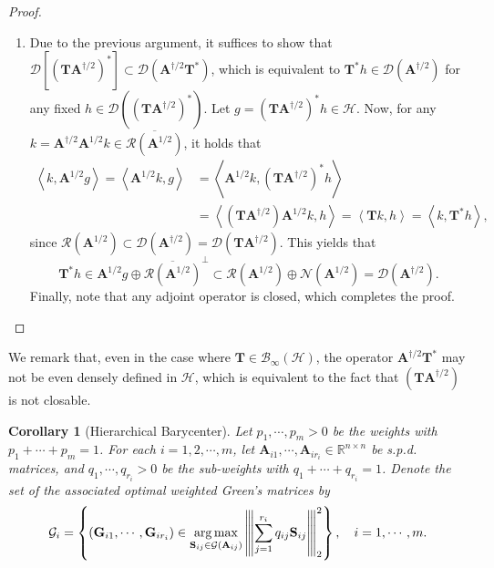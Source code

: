 \documentclass[noinfoline]{imsart}\setcounter{tocdepth}{2}
\renewcommand{\b}[1]{\mathbb{#1}} %
\newcommand{\m}[1]{\mathbf{#1}} %
\renewcommand{\c}[1]{\mathcal{#1}} %
\newcommand{\innpr}[2]{{\left\langle {#1},{#2}\right\rangle}} %
\DeclareMathOperator*{\argmax}{\arg\max}
\newcommand{\vertiii}[1]{{\left\vert\kern-0.25ex\left\vert\kern-0.25ex\left\vert #1 
    \right\vert\kern-0.25ex\right\vert\kern-0.25ex\right\vert}} %
\theoremstyle{plain}
\newtheorem{corollary}[theorem]{Corollary}
\begin{document}
\begin{appendix}
\begin{proof}
\begin{enumerate}[leftmargin=*]
\item %
Due to the previous argument, it suffices to show that $\c{D}[(\m{T} \m{A}^{\dagger/2})^{*}] \subset \c{D}(\m{A}^{\dagger/2} \m{T}^{*})$, which is equivalent to $\m{T}^{*} h \in \c{D}(\m{A}^{\dagger/2})$ for any fixed $h \in \c{D}((\m{T} \m{A}^{\dagger/2})^{*})$. %
Let $g = (\m{T} \m{A}^{\dagger/2})^{*} h  \in \c{H}$. Now, for any $k = \m{A}^{\dagger/2} \m{A}^{1/2} k \in \overline{\c{R}(\m{A}^{1/2})}$, it holds that
\begin{align*}
    \innpr{k}{\m{A}^{1/2} g} = \innpr{\m{A}^{1/2} k}{g} &= \innpr{\m{A}^{1/2} k}{(\m{T} \m{A}^{\dagger/2})^{*} h} \\
    &= \innpr{ (\m{T} \m{A}^{\dagger/2}) \m{A}^{1/2} k}{h} = \innpr{\m{T} k}{h} = \innpr{k}{\m{T}^{*} h},
\end{align*}
since $\c{R}(\m{A}^{1/2}) \subset \c{D}(\m{A}^{\dagger/2}) = \c{D}(\m{T} \m{A}^{\dagger/2})$. This yields that 
\begin{equation*}
    \m{T}^{*} h \in \m{A}^{1/2} g \oplus \overline{\c{R}(\m{A}^{1/2})}^{\perp} \subset \c{R}(\m{A}^{1/2}) \oplus \c{N}(\m{A}^{1/2}) = \c{D}(\m{A}^{\dagger/2}).
\end{equation*}
Finally, note that any adjoint operator is closed, which completes the proof.
\end{enumerate}
\end{proof}

We remark that, even in the case where $\m{T} \in \c{B}_{\infty}(\c{H})$, the operator $\m{A}^{\dagger/2} \m{T}^{*}$ may not be even densely defined in $\c{H}$, which is equivalent to the fact that $(\m{T} \m{A}^{\dagger/2})$ is not closable.




\begin{corollary}[Hierarchical Barycenter]\label{cor:hier:bary}
Let $p_{1}, \cdots, p_{m} > 0$ be the weights with $p_{1} + \cdots + p_{m} = 1$. For each $i = 1, 2, \cdots, m$, let
$\m{A}_{i 1}, \cdots, \m{A}_{i r_{i}}  \in \b{R}^{n \times n}$ be s.p.d. matrices, and $q_{1}, \cdots, q_{r_{i}} > 0$ be the sub-weights with $q_{1} + \cdots + q_{r_{i}} = 1$. Denote the set of the associated optimal weighted Green's matrices by
\begin{align*}
    \c{G}_{i} = \left\{(\m{G}_{i 1}, \cdots, \m{G}_{i r_{i}}) \in \argmax_{\m{S}_{ij} \in \c{G}(\m{A}_{ij})} \vertiii{\sum_{j=1}^{r_{i}} q_{ij} \m{S}_{ij}}_{2}^{2} \right\}, \quad i = 1, \cdots, m. 
\end{align*}


\end{corollary}
\end{appendix}
\end{document}

